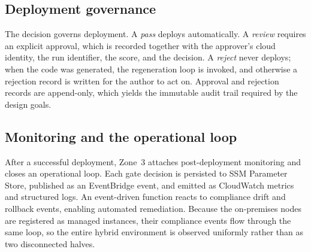 \subsection{Deployment governance}
\label{subsec:method-governance}

The decision governs deployment. A \emph{pass} deploys automatically. A \emph{review}
requires an explicit approval, which is recorded together with the approver's cloud
identity, the run identifier, the score, and the decision. A \emph{reject} never
deploys; when the code was generated, the regeneration loop is invoked, and otherwise a
rejection record is written for the author to act on. Approval and rejection records are
append-only, which yields the immutable audit trail required by the design goals.

\subsection{Monitoring and the operational loop}
\label{subsec:method-monitoring}

After a successful deployment, Zone~3 attaches post-deployment monitoring and closes an
operational loop. Each gate decision is persisted to SSM Parameter Store, published as an
EventBridge event, and emitted as CloudWatch metrics and structured logs. An
event-driven function reacts to compliance drift and rollback events, enabling automated
remediation. Because the on-premises nodes are registered as managed instances, their
compliance events flow through the same loop, so the entire hybrid environment is
observed uniformly rather than as two disconnected halves.
